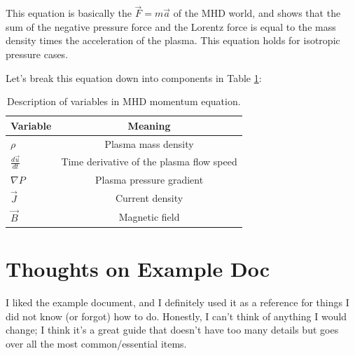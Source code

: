 \documentclass[12pt, letterpaper]{article}
\begin{document}
This equation is basically the $\vec{F}=m\vec{a}$ of the MHD world, and shows that the sum of the negative pressure force and the Lorentz force is equal to the mass density times the acceleration of the plasma. This equation holds for isotropic pressure cases.

Let's break this equation down into components in Table \ref{tab:1}:

\begin{table}[ht!]
  \centering
  \begin{tabular}{|l|c|}
    \hline
    Variable & Meaning\\
    \hline
    $\rho$ & Plasma mass density\\ 
    $\frac{d \vec{u}}{dt}$ & Time derivative of the plasma flow speed\\
    $\nabla P$ & Plasma pressure gradient\\
    $\vec{J}$ & Current density\\
    $\vec{B}$ & Magnetic field\\
    \hline
  \end{tabular}
  \caption{Description of variables in MHD momentum equation.}
  \label{tab:1}
\end{table}

\section{Thoughts on Example Doc}


I liked the example document, and I definitely used it as a reference for things I did not know (or forgot) how to do. Honestly, I can't think of anything I would change; I think it's a great guide that doesn't have too many details but goes over all the most common/essential items.
\end{document}
